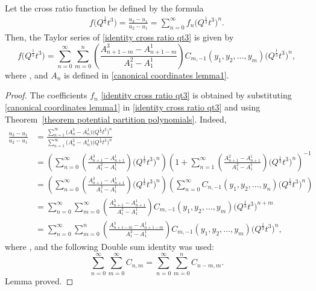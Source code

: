\begin{Lemma}
Let the cross ratio function be defined by the formula
\begin{gather}
f\bigl(Q^{\frac{1}{3}}t^3\bigr)=\frac{u_3-u_1}{u_2-u_1} =\sum_{n=0}^{\infty} f_n \bigl(Q^{\frac{1}{3}}t^3\bigr)^n.\label{identity cross ratio qt3}
\end{gather}
Then, the Taylor series of \eqref{identity cross ratio qt3} is given by
\[%
f\bigl(Q^{\frac{1}{3}}t^3\bigr)=\sum_{n=0}^{\infty} \sum_{m=0}^{n}\left(\frac{A_{n+1-m}^3-A_{n+1-m}^1}{A_1^2-A_1^1}\right)C_{m,-1}(y_1,y_2,\dots,y_m) \bigl( Q^{\frac{1}{3}}t^3 \bigr)^{n},
\]
where
,
and $A_n$ is defined in \eqref{canonical coordinates lemma1}.
\end{Lemma}

\begin{proof}
The coefficients $f_n$ \eqref{identity cross ratio qt3} is obtained by substituting \eqref{canonical coordinates lemma1} in \eqref{identity cross ratio qt3} and using Theorem~\ref{theorem potential partition polynomials}. Indeed,
\begin{align*}%
\frac{u_3-u_1}{u_2-u_1}&= \frac{\sum_{n=1}^{\infty} \bigl(A_n^3-A_n^1\bigr) \bigl( Q^{\frac{1}{3}}t^3 \bigr)^n}{\sum_{n=1}^{\infty} \bigl(A_n^2-A_n^1\bigr) \bigl( Q^{\frac{1}{3}}t^3 \bigr)^n}\\
&=\left(\sum_{n=0}^{\infty} \left(\frac{A_{n+1}^3-A_{n+1}^1}{A_1^2-A_1^1}\right) \bigl( Q^{\frac{1}{3}}t^3 \bigr)^n\right)\left(1+\sum_{n=1}^{\infty} \left(\frac{A_{n+1}^2-A_{n+1}^1}{A_1^2-A_1^1}\right) \bigl( Q^{\frac{1}{3}}t^3 \bigr)^n\right)^{-1}\\
&=\left(\sum_{n=0}^{\infty} \left(\frac{A_{n+1}^3-A_{n+1}^1}{A_1^2-A_1^1}\right) \bigl( Q^{\frac{1}{3}}t^3 \bigr)^n\right)\left(\sum_{n=0}^{\infty} C_{n,-1}(y_1,y_2,\dots,y_n) \bigl( Q^{\frac{1}{3}}t^3 \bigr)^n\right)\\
&=\sum_{n=0}^{\infty} \sum_{m=0}^{\infty}\left(\frac{A_{n+1}^3-A_{n+1}^1}{A_1^2-A_1^1}\right)C_{m,-1}(y_1,y_2,\dots,y_m) \bigl( Q^{\frac{1}{3}}t^3 \bigr)^{n+m}\\
&=\sum_{n=0}^{\infty} \sum_{m=0}^{n}\left(\frac{A_{n+1-m}^3-A_{n+1-m}^1}{A_1^2-A_1^1}\right)C_{m,-1}(y_1,y_2,\dots,y_m) \bigl( Q^{\frac{1}{3}}t^3 \bigr)^{n},
\end{align*}
where
,
and the following Double sum identity was used:
\[
\sum_{n=0}^{\infty}\sum_{m=0}^{\infty} C_{n,m}=\sum_{n=0}^{\infty}\sum_{m=0}^{n} C_{n-m,m}.
\]
Lemma proved.
\end{proof}


